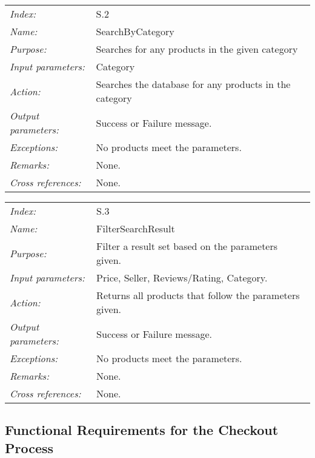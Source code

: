 \documentclass[10pt,letter]{article}
\begin{document}
\begin{tabularx}{\textwidth}{l X}
    \it{Index:} & S.2 \\
    \it{Name:} & SearchByCategory \\
    \it{Purpose:} & Searches for any products in the given category\\
    \it{Input parameters:} & Category\\
    \it{Action:} & Searches the database for any products in the category\\
    \it{Output parameters:} & Success or Failure message. \\
    \it{Exceptions:} & No products meet the parameters. \\
    \it{Remarks:} & None. \\
    \it{Cross references:} & None. \\
    \hline
\end{tabularx}

\begin{tabularx}{\textwidth}{l X}
    \it{Index:} & S.3 \\
    \it{Name:} & FilterSearchResult \\
    \it{Purpose:} & Filter a result set based on the parameters given.\\
    \it{Input parameters:} & Price, Seller, Reviews/Rating, Category.\\
    \it{Action:} & Returns all products that follow the parameters given.\\
    \it{Output parameters:} & Success or Failure message. \\
    \it{Exceptions:} & No products meet the parameters. \\
    \it{Remarks:} & None. \\
    \it{Cross references:} & None. \\
    \hline
\end{tabularx}

\subsection{Functional Requirements for the Checkout Process}
\end{document}
